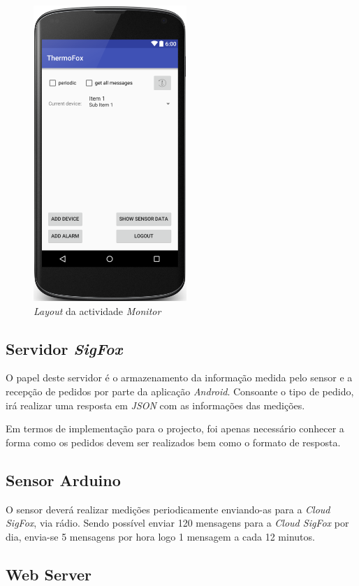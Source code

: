 \documentclass[a4paper]{article}
\begin{document}
\begin{figure}[H]
  \centering
  \includegraphics[scale=0.55]{ShowLogs.png}
  \caption{\textit{Layout} da actividade \textit{Monitor}}
  \label{fig:app_logs}
\end{figure}

\subsection{Servidor \textit{SigFox}}

O papel deste servidor é o armazenamento da informação medida pelo sensor e a recepção de pedidos por parte da aplicação \textit{Android}. Consoante o tipo de pedido, irá realizar uma resposta em \textit{JSON} com as informações das medições.

Em termos de implementação para o projecto, foi apenas necessário conhecer a forma como os pedidos devem ser realizados bem como o formato de resposta.

\subsection{Sensor Arduino}

O sensor deverá realizar medições periodicamente enviando-as para a \textit{Cloud SigFox}, via rádio. Sendo possível enviar 120 mensagens para a \textit{Cloud SigFox} por dia, envia-se 5 mensagens por hora logo 1 mensagem a cada 12 minutos.

\subsection{Web Server}
\end{document}
